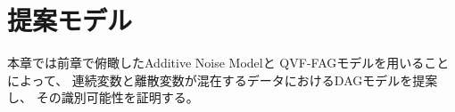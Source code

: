 
\section{提案モデル}
\label{part:proposal}

本章では前章で俯瞰したAdditive Noise Model\cite{Park2020-ey}と
QVF-FAGモデル\cite{Park2017-hw}を用いることによって、
連続変数と離散変数が混在するデータにおけるDAGモデルを提案し、
その識別可能性を証明する。
%

%

